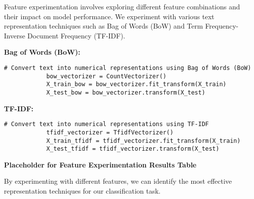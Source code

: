         Feature experimentation involves exploring different feature combinations and their impact on model performance. We experiment with various text representation techniques such as Bag of Words (BoW) and Term Frequency-Inverse Document Frequency (TF-IDF).

        \textbf{Bag of Words (BoW):}

        \begin{lstlisting}[caption={Convert text using Bag of Words (BoW)}, label={lst:bow_conversion}]
            # Convert text into numerical representations using Bag of Words (BoW)
            bow_vectorizer = CountVectorizer()
            X_train_bow = bow_vectorizer.fit_transform(X_train)
            X_test_bow = bow_vectorizer.transform(X_test)
        \end{lstlisting}
        
        \vspace{1em}

        \textbf{TF-IDF:}

        \begin{lstlisting}[caption={Convert text using TF-IDF}, label={lst:tfidf_conversion}]
            # Convert text into numerical representations using TF-IDF
            tfidf_vectorizer = TfidfVectorizer()
            X_train_tfidf = tfidf_vectorizer.fit_transform(X_train)
            X_test_tfidf = tfidf_vectorizer.transform(X_test)
        \end{lstlisting}
        
        \vspace{1em}

        \textbf{Placeholder for Feature Experimentation Results Table}

        By experimenting with different features, we can identify the most effective representation techniques for our classification task.
